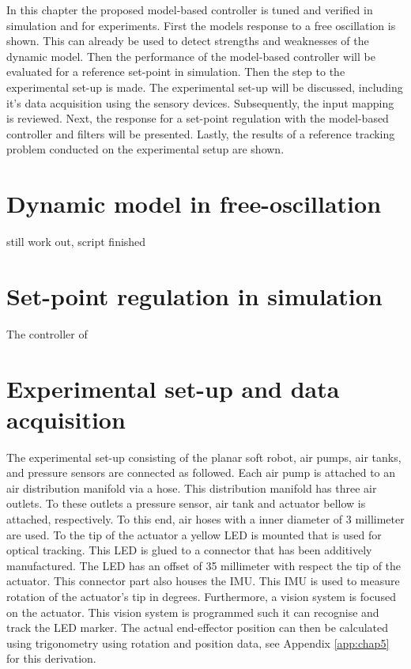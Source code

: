 \label{chap5}

In this chapter the proposed model-based controller is tuned and verified in simulation and for experiments. First the models response to a free oscillation is shown. This can already be used to detect strengths and weaknesses of the dynamic model. Then the performance of the model-based controller will be evaluated for a reference set-point in simulation. Then the step to the experimental set-up is made. The experimental set-up will be discussed, including it's data acquisition using the sensory devices. Subsequently, the input mapping is reviewed. Next, the response for a set-point regulation with the model-based controller and filters will be presented. Lastly, the results of a reference tracking problem conducted on the experimental setup are shown. 



\section{Dynamic model in free-oscillation}

still work out, script finished

\section{Set-point regulation in simulation}

The controller of 


\section{Experimental set-up and data acquisition}

The experimental set-up consisting of the planar soft robot, air pumps, air tanks, and pressure sensors are connected as followed. Each air pump is attached to an air distribution manifold via a hose. This distribution manifold has three air outlets. To these outlets a pressure sensor, air tank and actuator bellow is attached, respectively. To this end, air hoses with a inner diameter of 3 millimeter are used. To the tip of the actuator a yellow LED is mounted that is used for optical tracking. This LED is glued to a connector that has been additively manufactured. The LED has an offset of 35 millimeter with respect the tip of the actuator. This connector part also houses the IMU. This IMU is used to measure rotation of the actuator's tip in degrees. Furthermore, a vision system is focused on the actuator. This vision system is programmed such it can recognise and track the LED marker. The actual end-effector position can then be calculated using trigonometry using rotation and position data, see Appendix \ref{app:chap5} for this derivation. 

